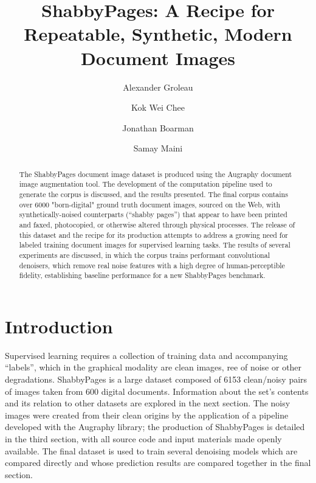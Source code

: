 \documentclass[runningheads]{llncs}
\begin{document}
\title{ShabbyPages: A Recipe for Repeatable, Synthetic, Modern Document Images}
\author{Alexander Groleau \and
  Kok Wei Chee \and
  Jonathan Boarman \and
  Samay Maini}



\maketitle

\begin{abstract}
The ShabbyPages document image dataset is produced using the Augraphy document image augmentation tool. The development of the computation pipeline used to generate the corpus is discussed, and the results presented. The final corpus contains over 6000 "born-digital" ground truth document images, sourced on the Web, with synthetically-noised counterparts (``shabby pages'') that appear to have been printed and faxed, photocopied, or otherwise altered through physical processes. The release of this dataset and the recipe for its production attempts to address a growing need for labeled training document images for supervised learning tasks. The results of several experiments are discussed, in which the corpus trains performant convolutional denoisers, which remove real noise features with a high degree of human-perceptible fidelity, establishing baseline performance for a new ShabbyPages benchmark.
\end{abstract}

\section{Introduction}
Supervised learning requires a collection of training data and accompanying ``labels'', which in the graphical modality are clean images, ree of noise or other degradations. ShabbyPages is a large dataset composed of 6153 clean/noisy pairs of images taken from 600 digital documents. Information about the set's contents and its relation to other datasets are explored in the next section. The noisy images were created from their clean origins by the application of a pipeline developed with the Augraphy library; the production of ShabbyPages is detailed in the third section, with all source code and input materials made openly available. The final dataset is used to train several denoising models which are compared directly and whose prediction results are compared together in the final section.
\end{document}
